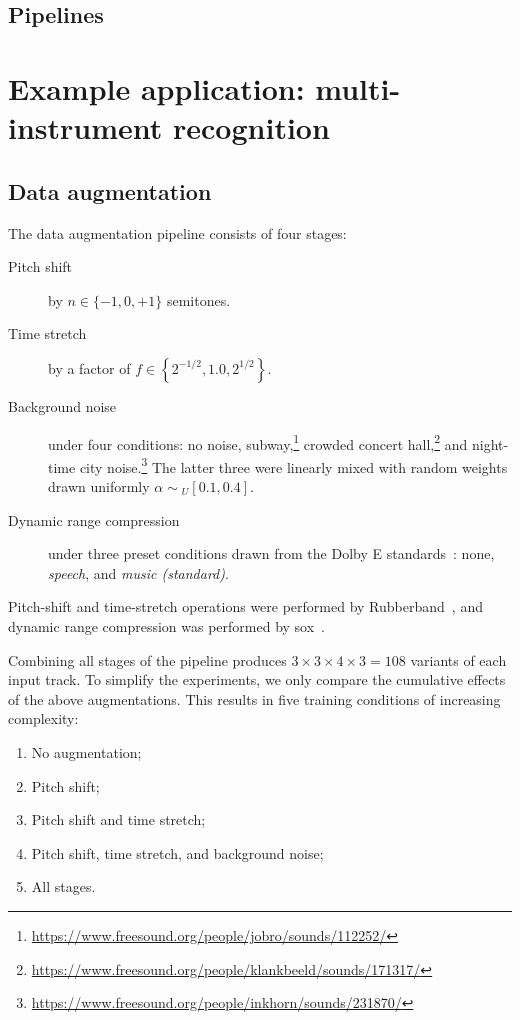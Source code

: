 \documentclass{article}
\begin{document}
\subsection{Pipelines}

\section{Example application: multi-instrument recognition}

\cite{bittner2014medleydb}

\subsection{Data augmentation}

The data augmentation pipeline consists of four stages:

\begin{description}
    \item[Pitch shift] by $n \in \{-1, 0, +1\}$ semitones.
    \item[Time stretch] by a factor of $f \in \left\{ 2^{-1/2}, 1.0, 2^{1/2}\right\}$.
    \item[Background noise] under four conditions: no noise,
        subway,\footnote{\url{https://www.freesound.org/people/jobro/sounds/112252/}}
        crowded concert hall,\footnote{\url{https://www.freesound.org/people/klankbeeld/sounds/171317/}}
        and night-time city noise.\footnote{\url{https://www.freesound.org/people/inkhorn/sounds/231870/}}
        The latter three were linearly mixed with random weights drawn uniformly
        $\alpha \sim { }_U[0.1, 0.4]$.
    \item[Dynamic range compression] under three preset conditions drawn from the {Dolby E}
        standards~\cite{dolbyE}: none, \emph{speech},
        and \emph{music (standard)}.
\end{description}

Pitch-shift and time-stretch operations were performed by Rubberband~\cite{rubberband}, and dynamic range
compression was performed by sox~\cite{sox}.

Combining all stages of the pipeline produces {$3\times 3\times 4\times 3 = 108$} variants of each input track.  To
simplify the experiments, we only compare the cumulative effects of the above
augmentations.  This results in five training conditions of increasing complexity:
\begin{enumerate}
    \item No augmentation;
        \vspace{-.5\baselineskip}
    \item Pitch shift;
        \vspace{-.5\baselineskip}
    \item Pitch shift and time stretch;
        \vspace{-.5\baselineskip}
    \item Pitch shift, time stretch, and background noise;
        \vspace{-.5\baselineskip}
    \item All stages.
\end{enumerate}
\end{document}
